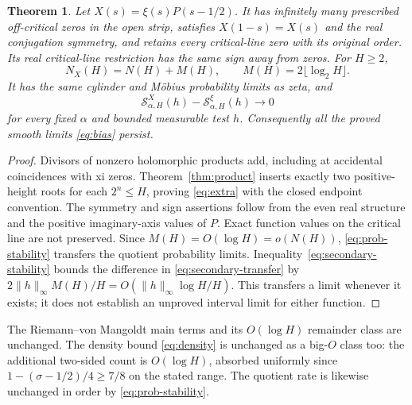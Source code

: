 \documentclass[11pt,a4paper]{article}
\newtheorem{theorem}{Theorem}[section]
\theoremstyle{definition}
\theoremstyle{remark}
\begin{document}
\begin{theorem}\label{thm:blindness}
Let $X(s)=\xi(s)P(s-1/2)$. It has infinitely many prescribed off-critical
zeros in the open strip, satisfies $X(1-s)=X(s)$ and the real conjugation
symmetry, and retains every critical-line zero with its original order.
Its real critical-line restriction has the same sign away from zeros.
For $H\ge2$,
\begin{equation}\label{eq:extra}
 N_X(H)=N(H)+M(H),\qquad M(H)=2\lfloor\log_2 H\rfloor.
\end{equation}
It has the same cylinder and M\"obius probability limits as zeta, and
\begin{equation}\label{eq:secondary-transfer}
 \mathcal S_{\alpha,H}^{X}(h)-\mathcal S_{\alpha,H}^{\xi}(h)\to0
\end{equation}
for every fixed $\alpha$ and bounded measurable test $h$. Consequently all
the proved smooth limits \eqref{eq:bias} persist.
\end{theorem}
\begin{proof}
Divisors of nonzero holomorphic products add, including at accidental
coincidences with xi zeros. Theorem~\ref{thm:product} inserts exactly two
positive-height roots for each $2^n\le H$, proving \eqref{eq:extra} with
the closed endpoint convention. The symmetry and sign assertions follow
from the even real structure and the positive imaginary-axis values of $P$.
Exact function values on the critical line are not preserved.
Since $M(H)=O(\log H)=o(N(H))$, \eqref{eq:prob-stability} transfers the
quotient probability limits. Inequality~\eqref{eq:secondary-stability}
bounds the difference in \eqref{eq:secondary-transfer} by
$2\|h\|_\infty M(H)/H=O(\|h\|_\infty\log H/H)$.
This transfers a limit whenever it exists; it does not establish an
unproved interval limit for either function.
\end{proof}

The Riemann--von Mangoldt main terms and its $O(\log H)$ remainder class
are unchanged. The density bound \eqref{eq:density} is unchanged as a
big-$O$ class too: the additional two-sided count is $O(\log H)$, absorbed
uniformly since $1-(\sigma-1/2)/4\ge7/8$ on the stated range.
The quotient rate is likewise unchanged in order by
\eqref{eq:prob-stability}.
\end{document}
